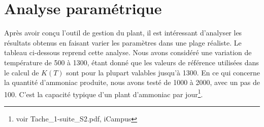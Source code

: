 \section{Analyse paramétrique}

Après avoir conçu l'outil de gestion du plant, il est intéressant d'analyser les résultats obtenus en faisant varier les 
paramètres dans une plage réaliste. Le tableau ci-dessous reprend cette analyse. Nous avons considéré une variation de 
température de \unit{500}{\kelvin} à \unit{1300}{\kelvin}, étant donné que les valeurs de référence utilisées dans le 
calcul de $K(T)$ sont pour la plupart valables jusqu'à \unit{1300}{\kelvin}. En ce qui concerne la quantité d'ammoniac 
produite, nous avons testé de \unit{1000}{\ton} à \unit{2000}{\ton}, avec un pas de \unit{100}{\ton}. C'est la capacité 
typique d'un plant d'ammoniac par jour\footnote{voir Tache_1-suite_S2.pdf, iCampus}.
